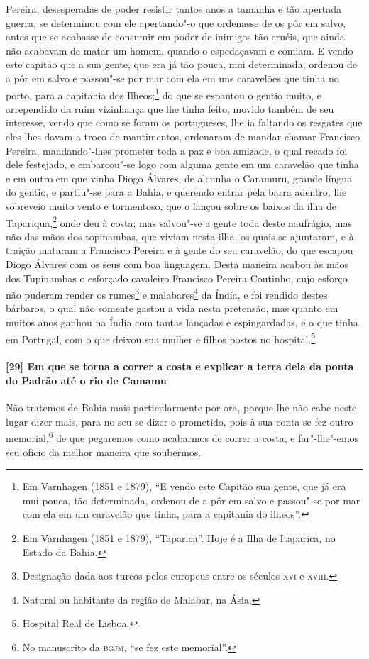 Pereira, desesperadas de poder resistir tantos anos a tamanha e tão apertada guerra, se
determinou com ele apertando"-o que ordenasse de os pôr em salvo, antes que se acabasse de
consumir em poder de inimigos tão cruéis, que ainda não acabavam de matar um homem, quando
o espedaçavam e comiam. E vendo este capitão que a sua gente, que era já tão pouca, mui
determinada, ordenou de a pôr em salvo e passou"-se por mar com ela em uns caravelões que
tinha no porto, para a capitania dos Ilheos;\footnote{ Em Varnhagen (1851 e 1879), ``E
vendo este Capitão sua gente, que já era mui pouca, tão determinada, ordenou de a pôr em
salvo e passou"-se por mar com ela em um caravelão que tinha, para a capitania do
ilheos''.} do que se espantou o gentio muito, e arrependido da ruim vizinhança que lhe
tinha feito, movido também de seu interesse, vendo que como se foram os portugueses, lhe
ia faltando os resgates que eles lhes davam a troco de mantimentos, ordenaram de mandar
chamar Francisco Pereira, mandando"-lhes prometer toda a paz e boa amizade, o qual recado
foi dele festejado, e embarcou"-se logo com alguma gente em um caravelão que tinha e em
outro em que vinha Diogo Álvares, de alcunha o Caramuru, grande língua do gentio, e
partiu"-se para a Bahia, e querendo entrar pela barra adentro, lhe sobreveio muito vento e
tormentoso, que o lançou sobre os baixos da ilha de Tapariqua,\footnote{ Em Varnhagen (1851
e 1879), ``Taparica''. Hoje é a Ilha de Itaparica, no Estado da Bahia.} onde deu à costa;
mas salvou"-se a gente toda deste naufrágio, mas não das mãos dos topinambas, que viviam
nesta ilha, os quais se ajuntaram, e à traição mataram a Francisco Pereira e à gente do
seu caravelão, do que escapou Diogo Álvares com os seus com boa linguagem. Desta maneira
acabou às mãos dos Tupinambas o esforçado cavaleiro Francisco Pereira Coutinho, cujo
esforço não puderam render os rumes\footnote{ Designação dada aos turcos pelos europeus
entre os séculos \textsc{xvi} e \textsc{xviii}.} e malabares\footnote{ Natural ou
habitante da região de Malabar, na Ásia.} da Índia, e foi rendido destes bárbaros, o qual
não somente gastou a vida nesta pretensão, mas quanto em muitos anos ganhou na Índia com
tantas lançadas e espingardadas, e o que tinha em Portugal, com o que deixou sua mulher e
filhos postos no hospital.\footnote{ Hospital Real de Lisboa.}

\paragraph{[29] Em que se torna a correr a costa e explicar a terra dela da ponta do Padrão
até o rio de Camamu} \quad
Não tratemos da Bahia mais particularmente por ora, porque lhe não cabe neste lugar dizer
mais, para no seu se dizer o prometido, pois à sua conta se fez outro memorial,\footnote{
No manuscrito da \textsc{bgjm}, ``se fez este memorial''.} de que pegaremos como acabarmos
de correr a costa, e far"-lhe"-emos seu ofício da melhor maneira que soubermos.

